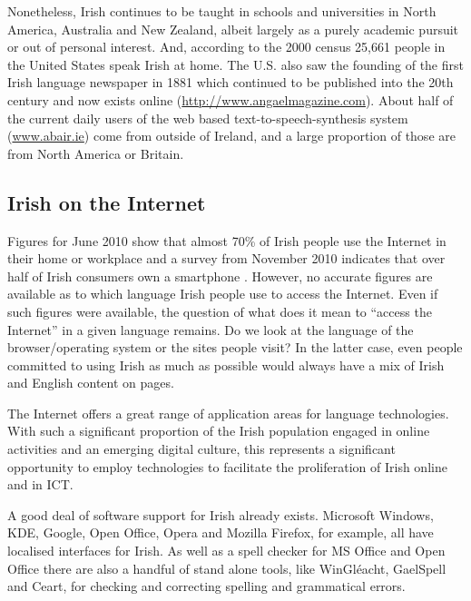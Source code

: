 \begin{multicols}{2}
Nonetheless, Irish continues to be taught in schools and universities in North America, Australia and New Zealand, albeit largely as a purely academic pursuit or out of personal interest. And, according to the 2000 census 25,661 people in the United States speak Irish at home. The U.S. also saw the founding of the first Irish language newspaper in 1881 which continued to be published into the 20th century and now exists online (\url{http://www.angaelmagazine.com}). About half of the current daily users of the web based text-to-speech-synthesis system (\url{www.abair.ie}) come from outside of Ireland, and a large proportion of those are from North America or Britain.

\subsection{Irish on the Internet}
Figures for June 2010 show that almost 70\% of Irish people use the Internet in their home or workplace \cite{internetstats} and a survey from November 2010 indicates that over half of Irish consumers own a smartphone \cite{mindshare}. However, no accurate figures are available as to which language Irish people use to access the Internet. Even if such figures were available, the question of what does it mean to ``access the Internet'' in a given language remains. Do we look at the language of the browser/operating system or the sites people visit? In the latter case, even people committed to using Irish as much as possible would always have a mix of Irish and English content on pages.

The Internet offers a great range of application areas for language technologies. With such a significant proportion of the Irish population engaged in online activities and an emerging digital culture, this represents a significant opportunity to employ technologies to facilitate the proliferation of Irish online and in ICT.

A good deal of software support for Irish already exists. Microsoft Windows, KDE, Google, Open Office, Opera and Mozilla Firefox, for example, all have localised interfaces for Irish. As well as a spell checker for MS Office and Open Office there are also a handful of stand alone tools, like WinGléacht, GaelSpell and Ceart, for checking and correcting spelling and grammatical errors. 




\end{multicols}
